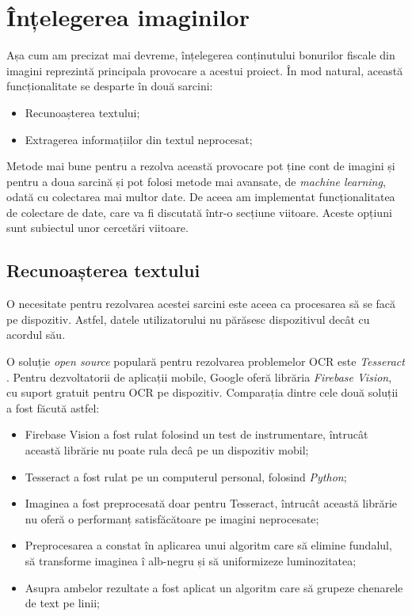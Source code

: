 \section{Înțelegerea imaginilor}

Așa cum am precizat mai devreme, înțelegerea conținutului bonurilor fiscale din imagini reprezintă principala provocare a acestui proiect. În mod natural, această funcționalitate se desparte în două sarcini:

\begin{itemize}
  \item 
  Recunoașterea textului;
  \item
  Extragerea informațiilor din textul neprocesat;
\end{itemize}

Metode mai bune pentru a rezolva această provocare pot ține cont de imagini și pentru a doua sarcină și pot folosi metode mai avansate, de \emph{machine learning}, odată cu colectarea mai multor date. De aceea am implementat funcționalitatea de colectare de date, care va fi discutată într-o secțiune viitoare. Aceste opțiuni sunt subiectul unor cercetări viitoare.

\subsection{Recunoașterea textului}

O necesitate pentru rezolvarea acestei sarcini este aceea ca procesarea să se facă pe dispozitiv. Astfel, datele utilizatorului nu părăsesc dispozitivul decât cu acordul său.

O soluție \emph{open source} populară pentru rezolvarea problemelor OCR este \emph{Tesseract} \cite{Tesseract}. Pentru dezvoltatorii de aplicații mobile, Google oferă librăria \emph{Firebase Vision}, cu suport gratuit pentru OCR pe dispozitiv. Comparația dintre cele două soluții a fost făcută astfel:

\begin{itemize}
  \item 
  Firebase Vision a fost rulat folosind un test de instrumentare, întrucât această librărie nu poate rula decâ pe un dispozitiv mobil;
  \item
  Tesseract a fost rulat pe un computerul personal, folosind \emph{Python};
  \item
  Imaginea a fost preprocesată doar pentru Tesseract, întrucât această librărie nu oferă o performanț satisfăcătoare pe imagini neprocesate;
  \item
  Preprocesarea a constat în aplicarea unui algoritm care să elimine fundalul, să transforme imaginea î alb-negru și să uniformizeze luminozitatea;
  \item
  Asupra ambelor rezultate a fost aplicat un algoritm care să grupeze chenarele de text pe linii;
\end{itemize}

